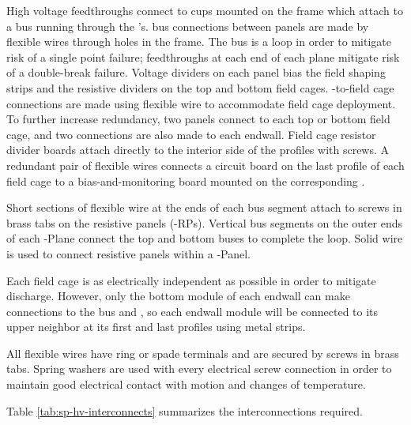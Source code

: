 High voltage feedthroughs connect to cups mounted on the  frame
which attach to a  bus running through the 's.   bus connections
between  panels are made by flexible wires through holes in the
 frame. The  bus is a loop in order to mitigate risk of a single
point failure; feedthroughs at each end of each  plane mitigate
risk of a double-break failure.  Voltage dividers on each  panel
bias the field shaping strips and the resistive dividers on the top
and bottom field cages.  -to-field cage connections are made using
flexible wire to accommodate field cage deployment.  To further
increase redundancy, two  panels connect to each top or bottom
field cage, and two connections are also made to each endwall.  Field
cage resistor divider boards attach directly to the interior side of
the  profiles with screws.  A redundant pair of flexible wires
connects a circuit board on the last profile of each field cage to a
bias-and-monitoring board mounted on the corresponding .

Short sections of flexible wire at the ends of each  bus segment
attach to screws in brass tabs on the  resistive panels (-RPs).
Vertical  bus segments on the outer ends of each -Plane connect
the top and bottom  buses to complete the loop.  Solid wire is used
to connect resistive panels within a -Panel.

Each field cage is as electrically independent as possible in order to
mitigate discharge.  However, only the bottom module of each endwall
can make connections to the  bus and , so each endwall module
will be connected to its upper neighbor at its first and last profiles
using metal strips.

All flexible wires have ring or spade terminals and are secured by
screws in brass tabs.  Spring washers are used with every electrical
screw connection in order to maintain good electrical contact with
motion and changes of temperature.

Table \ref{tab:sp-hv-interconnects} summarizes the interconnections
required.

